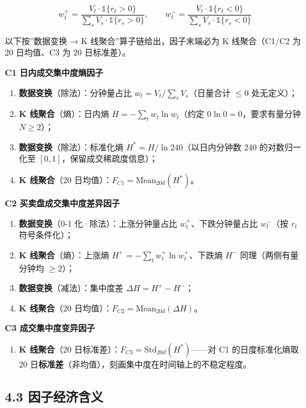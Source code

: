 \documentclass[UTF8,a4paper,zihao=-4,fontset=windows]{ctexart}
\providecommand{\tightlist}{\setlength{\itemsep}{0pt}\setlength{\parskip}{0pt}}
\begin{document}
\[w_t^+=\frac{V_t\cdot\mathbb{1}\{r_t>0\}}{\sum_s V_s\cdot\mathbb{1}\{r_s>0\}},\qquad w_t^-=\frac{V_t\cdot\mathbb{1}\{r_t<0\}}{\sum_s V_s\cdot\mathbb{1}\{r_s<0\}}\]

以下按''数据变换 → K 线聚合''算子链给出，因子末端必为 K 线聚合（C1/C2 为
20 日均值、C3 为 20 日标准差）。

\textbf{C1 日内成交集中度熵因子}

\begin{enumerate}
\def\labelenumi{\arabic{enumi}.}
\tightlist
\item
  \textbf{数据变换}（除法）：分钟量占比 \(w_t=V_t/\sum_s V_s\)（日量合计
  \(\le0\) 处无定义）；
\item
  \textbf{K 线聚合}（熵）：日内熵 \(H=-\sum_t w_t\ln w_t\)（约定
  \(0\ln0=0\)，要求有量分钟 \(N\ge2\)）；
\item
  \textbf{数据变换}（除法）：标准化熵 \(H^*=H/\ln 240\)（以日内分钟数
  240 的对数归一化至 \([0,1]\)，保留成交稀疏度信息）；
\item
  \textbf{K 线聚合}（20 日均值）：\(F_{C1}=\mathrm{Mean}_{20d}(H^*)\)。
\end{enumerate}

\textbf{C2 买卖盘成交集中度差异因子}

\begin{enumerate}
\def\labelenumi{\arabic{enumi}.}
\tightlist
\item
  \textbf{数据变换}（0-1 化·除法）：上涨分钟量占比
  \(w_t^+\)、下跌分钟量占比 \(w_t^-\)（按 \(r_t\) 符号条件化）；
\item
  \textbf{K 线聚合}（熵）：上涨熵 \(H^+=-\sum_t w_t^+\ln w_t^+\)、下跌熵
  \(H^-\) 同理（两侧有量分钟均 \(\ge2\)）；
\item
  \textbf{数据变换}（减法）：集中度差 \(\Delta H=H^+-H^-\)；
\item
  \textbf{K 线聚合}（20
  日均值）：\(F_{C2}=\mathrm{Mean}_{20d}(\Delta H)\)。
\end{enumerate}

\textbf{C3 成交集中度变异因子}

\begin{enumerate}
\def\labelenumi{\arabic{enumi}.}
\tightlist
\item
  \textbf{K 线聚合}（20
  日标准差）：\(F_{C3}=\mathrm{Std}_{20d}(H^*)\)------对 C1
  的日度标准化熵取 20
  日\textbf{标准差}（非均值），刻画集中度在时间轴上的不稳定程度。
\end{enumerate}

\subsection{4.3
因子经济含义}\label{ux56e0ux5b50ux7ecfux6d4eux542bux4e49-2}
\end{document}
